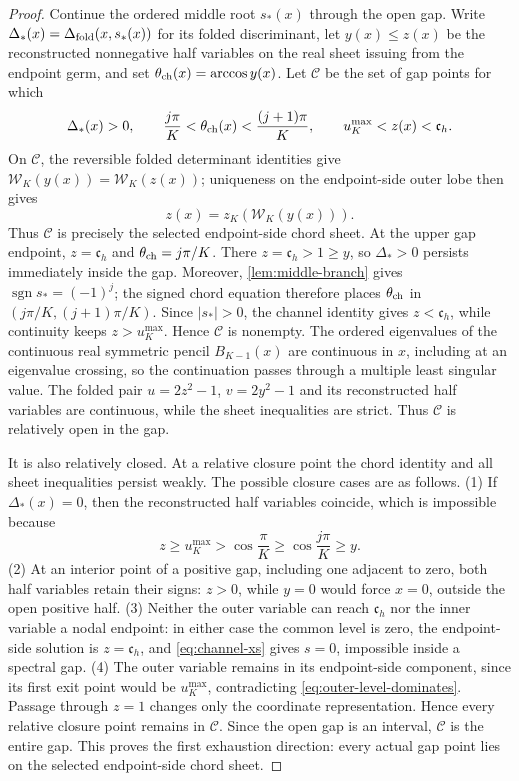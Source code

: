 \documentclass[preprints,article,accept,oneauthor]{Definitions/mdpi}
\numberwithin{equation}{section}
\theoremstyle{mdpi}
\theoremstyle{definition}
\begin{document}
\begin{proof}
Continue the ordered middle root \(s_*(x)\) through the open gap.  Write
\(\Delta_*(x)=\Delta_{\rm fold}(x,s_*(x))\) for its folded discriminant,
let \(y(x)\leq z(x)\) be the reconstructed nonnegative half variables on
the real sheet issuing from the endpoint germ, and set
\(\theta_{\rm ch}(x)=\arccos y(x)\).  Let \(\mathcal C\) be the set of gap points for
which
\[
 \Delta_*(x)>0,\qquad
 \frac{j\pi}{K}<\theta_{\rm ch}(x)<\frac{(j+1)\pi}{K},\qquad
 u_K^{\max}<z(x)<\mathfrak c_h.
\]
On \(\mathcal C\), the reversible folded determinant identities give
\(\mathcal W_K(y(x))=\mathcal W_K(z(x))\); uniqueness on the endpoint-side
outer lobe then gives
\[
 z(x)=z_K(\mathcal W_K(y(x))).
\]
Thus \(\mathcal C\) is precisely the selected endpoint-side chord sheet.
At the upper gap endpoint, \(z=\mathfrak c_h\) and
\(\theta_{\rm ch}=j\pi/K\).  There
\(z=\mathfrak c_h>1\geq y\), so \(\Delta_*>0\) persists immediately
inside the gap.  Moreover,
\cref{lem:middle-branch} gives \(\operatorname{sgn}s_*=(-1)^j\); the signed
chord equation therefore places
\(\theta_{\rm ch}\) in
\((j\pi/K,(j+1)\pi/K)\).  Since \(|s_*|>0\), the channel identity gives
\(z<\mathfrak c_h\), while continuity keeps \(z>u_K^{\max}\).  Hence
\(\mathcal C\) is nonempty.  The ordered eigenvalues of the continuous real symmetric pencil
\(B_{K-1}(x)\) are continuous in \(x\), including at an eigenvalue crossing,
so the continuation passes through a multiple least singular value.  The
folded pair \(u=2z^2-1\), \(v=2y^2-1\) and its reconstructed half variables
are continuous, while the sheet inequalities are strict.  Thus
\(\mathcal C\) is relatively open in the gap.

It is also relatively closed.  At a relative closure point the chord
identity and all sheet inequalities persist weakly.  The possible closure
cases are as follows.  (1) If \(\Delta_*(x)=0\), then the reconstructed half
variables coincide, which is impossible because
\[
 z\geq u_K^{\max}>\cos\frac{\pi}{K}
 \geq\cos\frac{j\pi}{K}\geq y.
\]
(2) At an interior point of a positive gap, including one adjacent to zero,
both half variables retain their signs: \(z>0\), while \(y=0\) would force
\(x=0\), outside the open positive half.  (3) Neither the outer variable can
reach \(\mathfrak c_h\) nor the inner variable a nodal endpoint: in either
case the common level is zero, the endpoint-side solution is
\(z=\mathfrak c_h\), and \eqref{eq:channel-xs} gives \(s=0\), impossible
inside a spectral gap.  (4) The
outer variable remains in its endpoint-side component, since its first exit
point would be \(u_K^{\max}\), contradicting
\eqref{eq:outer-level-dominates}.  Passage through \(z=1\) changes only the
coordinate representation.  Hence every relative closure point remains in
\(\mathcal C\).  Since the open gap is an interval, \(\mathcal C\) is the
entire gap.  This proves the first exhaustion direction: every actual gap
point lies on the selected endpoint-side chord sheet.


\end{proof}
\end{document}
